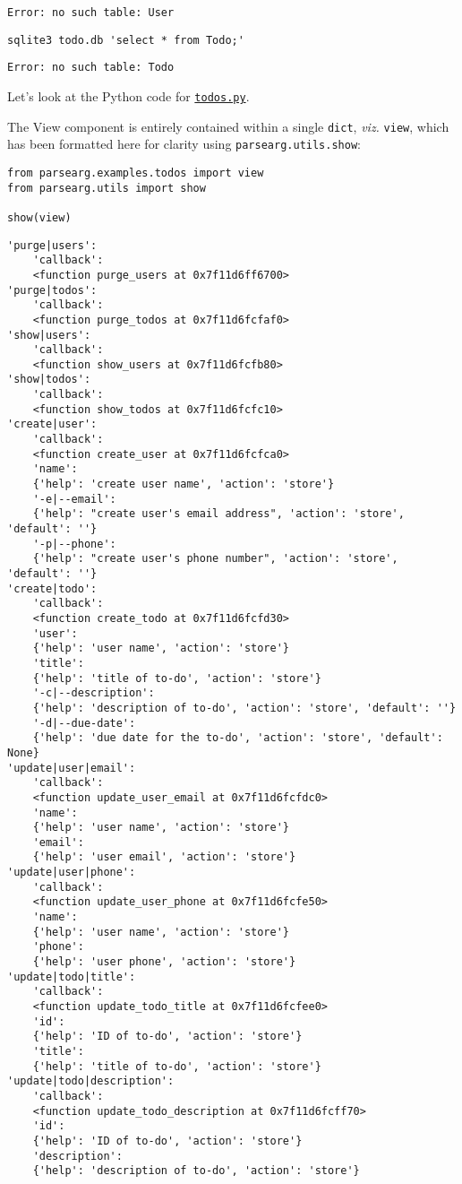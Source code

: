 \documentclass[10pt]{amsart}
\numberwithin{equation}{section}
\begin{document}
\begin{verbatim}
Error: no such table: User
\end{verbatim}


\begin{verbatim}
sqlite3 todo.db 'select * from Todo;'
\end{verbatim}

\begin{verbatim}
Error: no such table: Todo
\end{verbatim}


Let's look at the Python code for \href{https://github.com/tharte/parsearg/blob/master/parsearg/examples/todos.py}{\texttt{todos.py}}.

The View component is entirely contained within a single \texttt{dict}, \emph{viz.} 
\texttt{view}, which has been formatted here for clarity using \texttt{parsearg.utils.show}:
\begin{verbatim}
from parsearg.examples.todos import view
from parsearg.utils import show

show(view)
\end{verbatim}

\begin{verbatim}
'purge|users':
    'callback':
    <function purge_users at 0x7f11d6ff6700>
'purge|todos':
    'callback':
    <function purge_todos at 0x7f11d6fcfaf0>
'show|users':
    'callback':
    <function show_users at 0x7f11d6fcfb80>
'show|todos':
    'callback':
    <function show_todos at 0x7f11d6fcfc10>
'create|user':
    'callback':
    <function create_user at 0x7f11d6fcfca0>
    'name':
    {'help': 'create user name', 'action': 'store'}
    '-e|--email':
    {'help': "create user's email address", 'action': 'store', 'default': ''}
    '-p|--phone':
    {'help': "create user's phone number", 'action': 'store', 'default': ''}
'create|todo':
    'callback':
    <function create_todo at 0x7f11d6fcfd30>
    'user':
    {'help': 'user name', 'action': 'store'}
    'title':
    {'help': 'title of to-do', 'action': 'store'}
    '-c|--description':
    {'help': 'description of to-do', 'action': 'store', 'default': ''}
    '-d|--due-date':
    {'help': 'due date for the to-do', 'action': 'store', 'default': None}
'update|user|email':
    'callback':
    <function update_user_email at 0x7f11d6fcfdc0>
    'name':
    {'help': 'user name', 'action': 'store'}
    'email':
    {'help': 'user email', 'action': 'store'}
'update|user|phone':
    'callback':
    <function update_user_phone at 0x7f11d6fcfe50>
    'name':
    {'help': 'user name', 'action': 'store'}
    'phone':
    {'help': 'user phone', 'action': 'store'}
'update|todo|title':
    'callback':
    <function update_todo_title at 0x7f11d6fcfee0>
    'id':
    {'help': 'ID of to-do', 'action': 'store'}
    'title':
    {'help': 'title of to-do', 'action': 'store'}
'update|todo|description':
    'callback':
    <function update_todo_description at 0x7f11d6fcff70>
    'id':
    {'help': 'ID of to-do', 'action': 'store'}
    'description':
    {'help': 'description of to-do', 'action': 'store'}
\end{verbatim}
\end{document}
